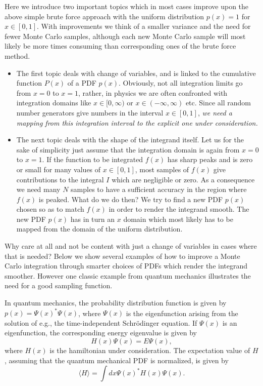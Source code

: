 Here we introduce two important topics which in most cases improve
upon the above simple brute force approach with the uniform distribution
$p(x)=1$ for $x \in [0,1]$. With improvements we think of 
a smaller variance and the need for fewer Monte Carlo samples,
although each new Monte Carlo sample will most likely be 
more times consuming than corresponding ones of the brute force method.
\begin{svgraybox}
\begin{itemize}
\item
The first topic deals with change of variables, and is linked
to the cumulative function $P(x)$ of a PDF $p(x)$. 
Obviously, not all integration limits go from $x=0$ to $x=1$,
rather, in physics we are often confronted with integration 
domains like $x \in [0,\infty)$ or $x\in (-\infty, \infty)$ etc. 
Since all random number generators give numbers in the interval
$x \in [0,1]$, 
{\em we need  a mapping from this integration interval to the explicit
one under consideration.}

\item The next topic deals with the shape of the integrand itself.
      Let us for the sake of simplicity just assume that the integration
      domain is again from $x=0$ to $x=1$. If the function to be
      integrated $f(x)$ has sharp peaks and is zero or small 
      for many values of $x \in [0,1]$, most samples of $f(x)$ give
      contributions to the integral $I$ which are negligible or zero.
      As a consequence we need many $N$ samples to have a sufficient
      accuracy in the region where $f(x)$ is peaked. 
      What do we do then? We try to find a new PDF $p(x)$ 
      chosen so as to match $f(x)$ in order to render the integrand
      smooth. The new PDF $p(x)$ has in turn an $x$ domain which most likely
      has to be mapped from the domain of the uniform distribution.
\end{itemize}
\end{svgraybox}
Why care at all and not be content with just a change of variables in cases
where that is needed?
Below we show several examples of how to improve a Monte Carlo
integration through smarter choices of PDFs which render the 
integrand smoother. However one classic example from quantum mechanics
illustrates the need for a good sampling function.

In quantum mechanics, the probability distribution function is given
by $p(x)=\Psi(x)^{\ast}\Psi(x)$, where $\Psi(x)$ is the eigenfunction
arising from the solution of e.g., the time-independent Schr\"odinger
equation. If $\Psi(x)$ is an eigenfunction, the corresponding energy
eigenvalue is given by
\[
    H(x)\Psi(x)=E\Psi(x),
\]
where $H(x)$ is the hamiltonian under consideration. The expectation
value of $H$, assuming that the quantum mechanical PDF is normalized, is
given by
\[
   \langle H \rangle =\int dx  \Psi(x)^{\ast}H(x)\Psi(x).
\]

